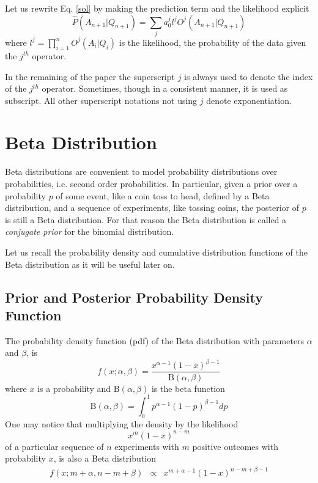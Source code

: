 \documentclass[runningheads]{llncs}
\begin{document}
Let us rewrite Eq. \ref{sol} by making the prediction term and the
likelihood explicit
\begin{equation}
  \label{sol-eas}
\hat{P}(A_{n+1}|Q_{n+1}) = \sum_j a_0^j l^j O^j(A_{n+1}|Q_{n+1})
\end{equation}
where $l^j = \prod_{i=1}^{n} O^j(A_i|Q_i)$ is the likelihood, the
probability of the data given the $j^{th}$ operator.

\begin{remark}
In the remaining of the paper the superscript $j$ is always used to
denote the index of the $j^{th}$ operator. Sometimes, though in a
consistent manner, it is used as subscript. All other superscript
notations not using $j$ denote exponentiation.
\end{remark}

\section{Beta Distribution}
\label{beta}

Beta distributions \cite{Abourizk94Fitting} are convenient to model
probability distributions over probabilities, i.e. second order
probabilities. In particular, given a prior over a probability $p$ of
some event, like a coin toss to head, defined by a Beta distribution,
and a sequence of experiments, like tossing coins, the posterior of
$p$ is still a Beta distribution. For that reason the Beta
distribution is called a \emph{conjugate prior} for the binomial
distribution.

Let us recall the probability density and cumulative distribution
functions of the Beta distribution as it will be useful later on.
\subsection{Prior and Posterior Probability Density Function}
The probability density function (pdf) of the Beta distribution with
parameters $\alpha$ and $\beta$, is
\begin{equation}
  \label{beta-pdf}
f(x; \alpha, \beta) = \frac{x^{\alpha - 1} (1-x)^{\beta - 1}}
                           {\mathrm{B}(\alpha, \beta)}
\end{equation}
where $x$ is a probability and $\mathrm{B}(\alpha, \beta)$ is the beta
function
\begin{equation}
\mathrm{B}(\alpha, \beta) = \int_0^1 p^{\alpha - 1}(1-p)^{\beta - 1}
dp
\end{equation}
One may notice that multiplying the density by the likelihood
\begin{equation}
x^m (1-x)^{n-m}
\end{equation}
of a particular sequence of $n$ experiments with $m$ positive outcomes
with probability $x$, is also a Beta distribution
\begin{eqnarray}
  f(x; m+\alpha, n-m+\beta) & \propto & x^{m+\alpha - 1}
                                        (1-x)^{n-m+\beta - 1}
\end{eqnarray}
\end{document}
